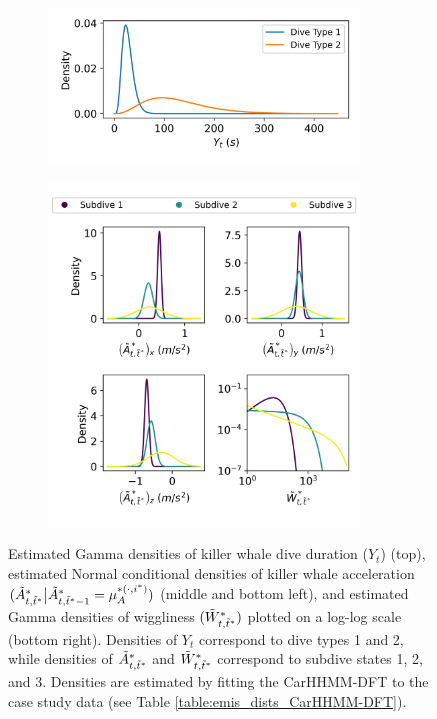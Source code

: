 \begin{figure}[ht]
    \begin{subfigure}{\textwidth}
    	\centering
    	\includegraphics[width=3.25in]{../Plots/2019/20190902-182840-CATs_OB_1_0_267_CarHHMM2-coarse-emissions.png}
    \end{subfigure}
    \newline
    \begin{subfigure}{\textwidth}
    	\centering
    	\includegraphics[width=3.25in]{../Plots/2019/20190902-182840-CATs_OB_1_0_267_CarHHMM2-fine-emissions.png}
    \end{subfigure}
    \caption{Estimated Gamma densities of killer whale dive duration ($Y_t$) (top), estimated Normal conditional densities of killer whale acceleration $(\tilde{A}^*_{t,\tilde t^*}\big|\tilde{A}^*_{t,\tilde t^*-1} = \mu_A^{*(\cdot,i^*)})$ (middle and bottom left), and estimated Gamma densities of wiggliness $(\tilde{W}^*_{t,\tilde t^*})$ plotted on a log-log scale (bottom right). Densities of $Y_t$ correspond to dive types 1 and 2, while densities of $\tilde{A}^*_{t,\tilde t^*}$ and $\tilde{W}^*_{t,\tilde t^*}$ correspond to subdive states 1, 2, and 3. Densities are estimated by fitting the CarHHMM-DFT to the case study data (see Table \ref{table:emis_dists_CarHHMM-DFT}).}
    \label{fig:emis}
\end{figure}

